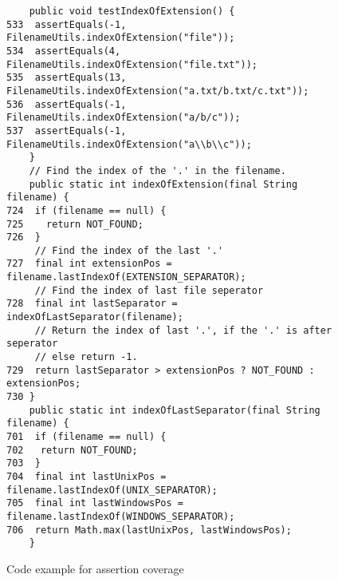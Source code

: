 \begin{figure}
\begin{lstlisting}
    public void testIndexOfExtension() {
533  assertEquals(-1, FilenameUtils.indexOfExtension("file"));
534  assertEquals(4, FilenameUtils.indexOfExtension("file.txt"));
535  assertEquals(13, FilenameUtils.indexOfExtension("a.txt/b.txt/c.txt"));
536  assertEquals(-1, FilenameUtils.indexOfExtension("a/b/c"));
537  assertEquals(-1, FilenameUtils.indexOfExtension("a\\b\\c"));
    }
	// Find the index of the '.' in the filename.
    public static int indexOfExtension(final String filename) {
724  if (filename == null) {
725    return NOT_FOUND;
726  }
	 // Find the index of the last '.' 
727  final int extensionPos = filename.lastIndexOf(EXTENSION_SEPARATOR);
	 // Find the index of last file seperator
728  final int lastSeparator = indexOfLastSeparator(filename);
	 // Return the index of last '.', if the '.' is after seperator
	 // else return -1.
729  return lastSeparator > extensionPos ? NOT_FOUND : extensionPos;
730 }
    public static int indexOfLastSeparator(final String filename) {
701  if (filename == null) {
702   return NOT_FOUND;
703  }
704  final int lastUnixPos = filename.lastIndexOf(UNIX_SEPARATOR);
705  final int lastWindowsPos = filename.lastIndexOf(WINDOWS_SEPARATOR);
706  return Math.max(lastUnixPos, lastWindowsPos);
    }
\end{lstlisting}
\vspace{3mm}
\caption{\label{fig:junit} Code example for assertion coverage}
\end{figure}

